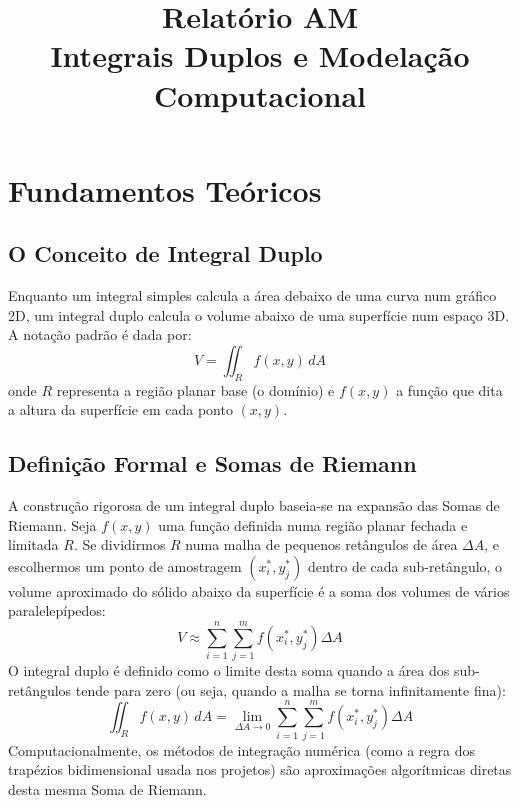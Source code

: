 \documentclass[12pt,a4paper]{article}
\title{\textbf{Relatório AM}\\ \large Integrais Duplos e Modelação Computacional}
\begin{document}
\maketitle

\tableofcontents
\newpage


\section{Fundamentos Teóricos}

\subsection{O Conceito de Integral Duplo}
Enquanto um integral simples calcula a área debaixo de uma curva num gráfico 2D, um integral duplo calcula o volume abaixo de uma superfície num espaço 3D. A notação padrão é dada por:
\begin{equation}
    V = \iint_R f(x,y) \,dA
\end{equation}
onde $R$ representa a região planar base (o domínio) e $f(x,y)$ a função que dita a altura da superfície em cada ponto $(x,y)$.

\subsection{Definição Formal e Somas de Riemann}
A construção rigorosa de um integral duplo baseia-se na expansão das Somas de Riemann. Seja $f(x,y)$ uma função definida numa região planar fechada e limitada 
$R$. Se dividirmos $R$ numa malha de pequenos retângulos de área $\Delta A$, e escolhermos um ponto de amostragem $(x_i^*, y_j^*)$ dentro de cada sub-retângulo, 
o volume aproximado do sólido abaixo da superfície é a soma dos volumes de vários paralelepípedos:
\begin{equation}
    V \approx \sum_{i=1}^{n} \sum_{j=1}^{m} f(x_i^*, y_j^*) \Delta A
\end{equation}
O integral duplo é definido como o limite desta soma quando a área dos sub-retângulos tende para zero (ou seja, quando a malha se torna infinitamente fina):
\begin{equation}
    \iint_R f(x,y) \,dA = \lim_{\Delta A \to 0} \sum_{i=1}^{n} \sum_{j=1}^{m} f(x_i^*, y_j^*) \Delta A
\end{equation}
Computacionalmente, os métodos de integração numérica (como a regra dos trapézios bidimensional usada nos projetos) são aproximações algorítmicas diretas desta mesma Soma de Riemann.
\end{document}
